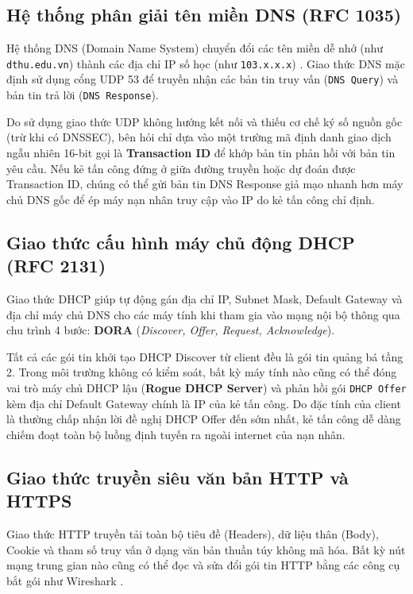 \subsection{Hệ thống phân giải tên miền DNS (RFC 1035)}

Hệ thống DNS (Domain Name System) chuyển đổi các tên miền dễ nhớ (như \texttt{dthu.edu.vn}) thành các địa chỉ IP số học (như \texttt{103.x.x.x}) \cite{rfc1035_dns}. Giao thức DNS mặc định sử dụng cổng UDP 53 để truyền nhận các bản tin truy vấn (\texttt{DNS Query}) và bản tin trả lời (\texttt{DNS Response}).

Do sử dụng giao thức UDP không hướng kết nối và thiếu cơ chế ký số nguồn gốc (trừ khi có DNSSEC), bên hỏi chỉ dựa vào một trường mã định danh giao dịch ngẫu nhiên 16-bit gọi là \textbf{Transaction ID} để khớp bản tin phản hồi với bản tin yêu cầu. Nếu kẻ tấn công đứng ở giữa đường truyền hoặc dự đoán được Transaction ID, chúng có thể gửi bản tin DNS Response giả mạo nhanh hơn máy chủ DNS gốc để ép máy nạn nhân truy cập vào IP do kẻ tấn công chỉ định.

\subsection{Giao thức cấu hình máy chủ động DHCP (RFC 2131)}

Giao thức DHCP \cite{rfc2131_dhcp} giúp tự động gán địa chỉ IP, Subnet Mask, Default Gateway và địa chỉ máy chủ DNS cho các máy tính khi tham gia vào mạng nội bộ thông qua chu trình 4 bước: \textbf{DORA} (\textit{Discover, Offer, Request, Acknowledge}).

Tất cả các gói tin khởi tạo DHCP Discover từ client đều là gói tin quảng bá tầng 2. Trong môi trường không có kiểm soát, bất kỳ máy tính nào cũng có thể đóng vai trò máy chủ DHCP lậu (\textbf{Rogue DHCP Server}) và phản hồi gói \texttt{DHCP Offer} kèm địa chỉ Default Gateway chính là IP của kẻ tấn công. Do đặc tính của client là thường chấp nhận lời đề nghị DHCP Offer đến sớm nhất, kẻ tấn công dễ dàng chiếm đoạt toàn bộ luồng định tuyến ra ngoài internet của nạn nhân.

\subsection{Giao thức truyền siêu văn bản HTTP và HTTPS}

Giao thức HTTP truyền tải toàn bộ tiêu đề (Headers), dữ liệu thân (Body), Cookie và tham số truy vấn ở dạng văn bản thuần túy không mã hóa. Bất kỳ nút mạng trung gian nào cũng có thể đọc và sửa đổi gói tin HTTP bằng các công cụ bắt gói như Wireshark \cite{wireshark2024guide}.

